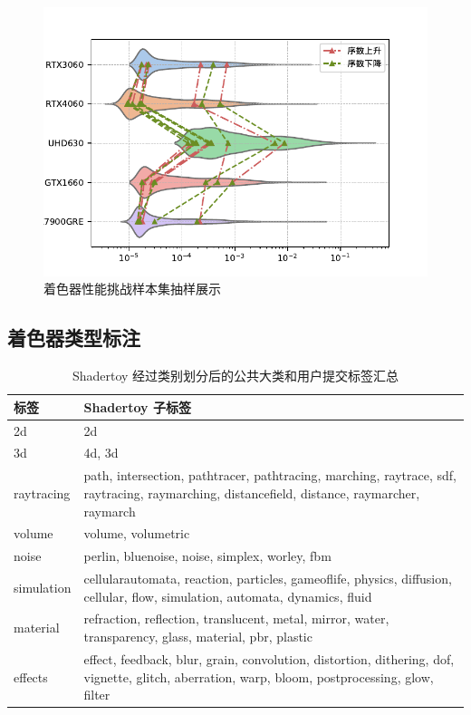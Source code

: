 \begin{figure}[h]
    \centering
    \includegraphics[width=0.8\linewidth]{figures/difficult.pdf}
    \caption{着色器性能挑战样本集抽样展示}
    \label{fig:difficultSamples_ch3}
  \end{figure}

\subsection{着色器类型标注}

\begin{table}[h]
    \centering
    \caption{Shadertoy 经过类别划分后的公共大类和用户提交标签汇总}
    \label{table:tag_classification}
    \begin{tabular}{p{2cm}|p{11cm}}
        \toprule
        标签 & Shadertoy 子标签 \\
        \midrule
        2d & 2d \\
        3d & 4d, 3d \\
        raytracing & path, intersection, pathtracer, pathtracing, marching, raytrace, sdf, raytracing, raymarching, distancefield, distance, raymarcher, raymarch \\
        volume & volume, volumetric \\
        noise & perlin, bluenoise, noise, simplex, worley, fbm \\
        simulation & cellularautomata, reaction, particles, gameoflife, physics, diffusion, cellular, flow, simulation, automata, dynamics, fluid \\
        material & refraction, reflection, translucent, metal, mirror, water, transparency, glass, material, pbr, plastic \\
        effects & effect, feedback, blur, grain, convolution, distortion, dithering, dof, vignette, glitch, aberration, warp, bloom, postprocessing, glow, filter \\
        \bottomrule
    \end{tabular}
\end{table}